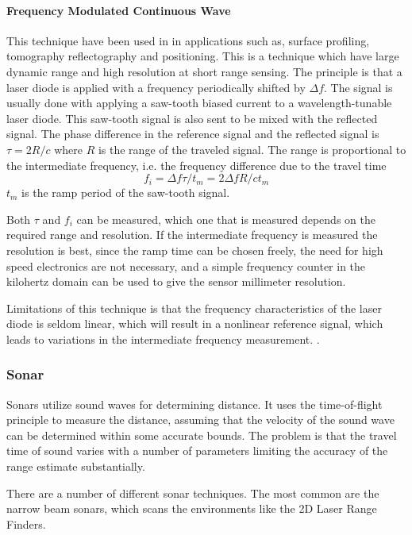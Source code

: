 \paragraph{Frequency Modulated Continuous Wave}
This technique have been used in in applications such as, surface profiling, tomography
reflectography and positioning. This is a technique which have large dynamic range and
high resolution at short range sensing. The principle is that a laser diode is applied
with a frequency periodically shifted by $\Delta f$. The signal is usually done with
applying a saw-tooth biased current to a wavelength-tunable laser diode. This saw-tooth
signal is also sent to be mixed with the reflected signal. The phase difference in the
reference signal and the reflected signal is $\tau = 2 R / c$ where $R$ is the range of
the traveled signal. The range is proportional to the intermediate frequency, i.e. the
frequency difference due to the travel time
\begin{equation}
    f_i = \Delta f \tau /t_m = 2 \Delta f R /c t_m
\end{equation}
$t_m$ is the ramp period of the saw-tooth signal. 

Both $\tau$ and $f_i$ can be measured, which one that is measured depends on the required
range and resolution. If the intermediate frequency is measured the resolution is best,
since the ramp time can be chosen freely, the need for high speed electronics are not
necessary, and a simple frequency counter in the kilohertz domain can be used to give the
sensor millimeter resolution.

Limitations of this technique is that the frequency characteristics of the laser diode is
seldom linear, which will result in a nonlinear reference signal, which leads to
variations in the intermediate frequency measurement.
\cite{laser-ranging-critical-review}.

\subsubsection{Sonar}
Sonars utilize sound waves for determining distance. It uses the time-of-flight principle
to measure the distance, assuming that the velocity of the sound wave can be determined
within some accurate bounds. The problem is that the travel time of sound varies with a
number of parameters limiting the accuracy of the range estimate substantially. 

There are a number of different sonar techniques. The most common are the narrow beam
sonars, which scans the environments like the 2D Laser Range Finders. \cite{mathisen}

